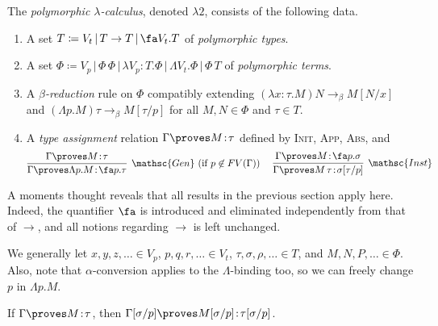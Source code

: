 \documentclass[reqno]{amsart}
\begin{document}
    \begin{definition}
        The \textit{polymorphic $\lambda$-calculus}, denoted $\lambda2$, consists of the following data.
        \begin{enumerate}
            \item A set $T\coloneqq V_t\,|\,T\rightarrow T\,|\,\fa V_t.T$ of \textit{polymorphic types}.
            \item A set $\Phi\coloneqq V_p\,|\,\Phi\,\Phi\,|\,\lambda V_p\!:\!T.\Phi\,|\,\Lambda V_t.\Phi\,|\,\Phi\,T$ of \textit{polymorphic terms}.
            \item A \textit{$\beta$-reduction} rule on $\Phi$ compatibly extending $(\lambda x\!:\!\tau.M)N\rightarrow_\beta M[N/x]$ and $(\Lambda p.M)\tau\rightarrow_\beta M[\tau/p]$ for all $M,N\in\Phi$ and $\tau\in T$.
            \item A \textit{type assignment} relation $\Gamma\proves M\!:\!\tau$ defined by \textsc{Init}, \textsc{App}, \textsc{Abs}, and
                \begin{equation*}
                    \infer[\mathsc{Gen}\ (\textrm{if }p\not\in FV(\Gamma))]{\Gamma\proves\Lambda p.M\!:\!\fa p.\tau}{\Gamma\proves M\!:\!\tau}\ \ \ \ 
                    \infer[\mathsc{Inst}]{\Gamma\proves M\,\tau\!:\!\sigma[\tau/p]}{\Gamma\proves M\!:\!\fa p.\sigma}
                \end{equation*}
        \end{enumerate}
    \end{definition}

    A moments thought reveals that all results in the previous section apply here. Indeed, the quantifier $\fa$ is introduced and eliminated independently from that of $\rightarrow$, and all notions regarding $\rightarrow$ is left unchanged.

    \begin{notation}
        We generally let $x,y,z,\ldots\in V_p$, $p,q,r,\ldots\in V_t$, $\tau,\sigma,\rho,\ldots\in T$, and $M,N,P,\ldots\in\Phi$. Also, note that $\alpha$-conversion applies to the $\Lambda$-binding too, so we can freely change $p$ in $\Lambda p.M$.
    \end{notation}

    \begin{lemma}\label{lem:polymorphic_variable_substitution}
        If $\Gamma\proves M\!:\!\tau$, then $\Gamma[\sigma/p]\proves M[\sigma/p]\!:\!\tau[\sigma/p]$.
    \end{lemma}
\end{document}
